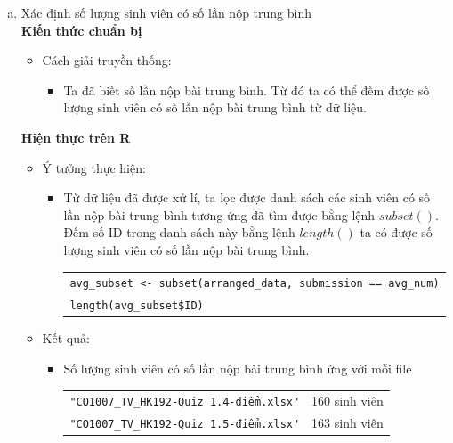 \documentclass[a4paper]{article}
\theoremstyle{definition}
\begin{document}
\begin{enumerate}[a)]
\begin{itemize}
\begin{itemize}
\begin{center}
            \end{center}
        \end{itemize}
    \end{itemize}
    \bf\item Xác định số lượng sinh viên có số lần nộp trung bình \\[6pt]
    \bf Kiến thức chuẩn bị\normalfont
    \begin{itemize}
        \item Cách giải truyền thống:
        \begin{itemize}
            \item Ta đã biết số lần nộp bài trung bình. Từ đó ta có thể đếm được số lượng sinh viên có số lần nộp bài trung bình từ dữ liệu.
        \end{itemize}
    \end{itemize}
    \bf Hiện thực trên R\normalfont
    \begin{itemize}
        \item Ý tưởng thực hiện:
        \begin{itemize}
            \item Từ dữ liệu đã được xử lí, ta lọc được danh sách các sinh viên có số lần nộp bài trung bình tương ứng đã tìm được bằng lệnh $subset()$. Đếm số ID trong danh sách này bằng lệnh $length()$ ta có được số lượng sinh viên có số lần nộp bài trung bình.
            \begin{center}
                \begin{tabular}{p{13cm}}
                    \texttt{avg\_subset <- subset(arranged\_data, submission == avg\_num)}\\
                    \texttt{length(avg\_subset\$ID)}
                \end{tabular}
            \end{center}    
        \end{itemize}
        \item Kết quả:
        \begin{itemize}
            \item Số lượng sinh viên có số lần nộp bài trung bình ứng với mỗi file
            \begin{center}
                \begin{tabular}{l l}
                     \texttt{"CO1007\_TV\_HK192-Quiz 1.4-điểm.xlsx"} & 160 sinh viên\\ 
                     \texttt{"CO1007\_TV\_HK192-Quiz 1.5-điểm.xlsx"} & 163 sinh viên\\ 

\end{tabular}
\end{center}
\end{itemize}
\end{itemize}
\end{enumerate}
\end{document}
